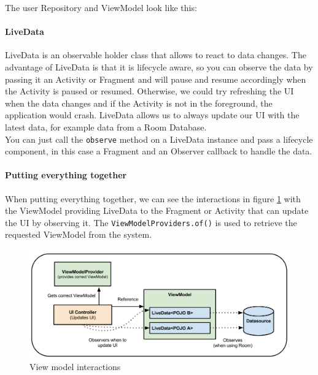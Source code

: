 \documentclass[11pt,a4paper]{report}
\begin{document}
The user Repository and ViewModel look like this:

\paragraph{LiveData}
LiveData\cite{android:doc:jetpack:livedata} is an observable holder class that allows to react to data changes. The advantage of LiveData is that it is lifecycle aware, so you can observe the data by passing it an Activity or Fragment and will pause and resume accordingly when the Activity is paused or resumed. Otherwise, we could try refreshing the UI when the data changes and if the Activity is not in the foreground, the application would crash. LiveData allows us to always update our UI with the latest data, for example data from a Room Database.\\

You can just call the \verb+observe+ method on a LiveData instance and pass a lifecycle component, in this case a Fragment and an Observer callback to handle the data.

\paragraph{Putting everything together}
When putting everything together\cite{android:codelab:room}, we can see the interactions in figure \ref{viewmodel_interactions_img} with the ViewModel providing LiveData to the Fragment or Activity that can update the UI by observing it. The \verb+ViewModelProviders.of()+ is used to retrieve the requested ViewModel from the system.
\begin{figure}[H]
\begin{center}
	\includegraphics[width=.8\textwidth]{assets/viewmodel}
	\caption[View model interactions]{View model interactions\cite{android:doc:viewmodel}}
	\label{viewmodel_interactions_img}
\end{center}
\end{figure}
\end{document}
